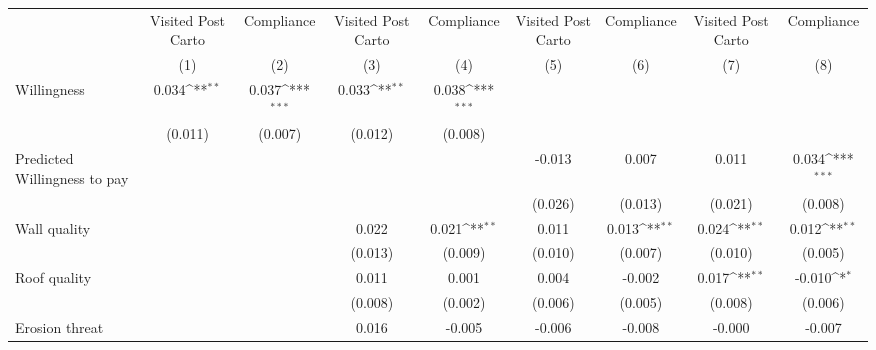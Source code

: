 {
\def\sym#1{\ifmmode^{#1}\else\(^{#1}\)\fi}
\begin{tabular}{l*{8}{c}}
\toprule
                &\multicolumn{1}{c}{Visited Post Carto}&\multicolumn{1}{c}{Compliance}&\multicolumn{1}{c}{Visited Post Carto}&\multicolumn{1}{c}{Compliance}&\multicolumn{1}{c}{Visited Post Carto}&\multicolumn{1}{c}{Compliance}&\multicolumn{1}{c}{Visited Post Carto}&\multicolumn{1}{c}{Compliance}\\
                &\multicolumn{1}{c}{(1)}         &\multicolumn{1}{c}{(2)}         &\multicolumn{1}{c}{(3)}         &\multicolumn{1}{c}{(4)}         &\multicolumn{1}{c}{(5)}         &\multicolumn{1}{c}{(6)}         &\multicolumn{1}{c}{(7)}         &\multicolumn{1}{c}{(8)}         \\
\midrule
Willingness     &    0.034\sym{**} &    0.037\sym{***}&    0.033\sym{**} &    0.038\sym{***}&                  &                  &                  &                  \\
                &  (0.011)         &  (0.007)         &  (0.012)         &  (0.008)         &                  &                  &                  &                  \\
Predicted Willingness to pay&                  &                  &                  &                  &   -0.013         &    0.007         &    0.011         &    0.034\sym{***}\\
                &                  &                  &                  &                  &  (0.026)         &  (0.013)         &  (0.021)         &  (0.008)         \\
Wall quality    &                  &                  &    0.022         &    0.021\sym{**} &    0.011         &    0.013\sym{**} &    0.024\sym{**} &    0.012\sym{**} \\
                &                  &                  &  (0.013)         &  (0.009)         &  (0.010)         &  (0.007)         &  (0.010)         &  (0.005)         \\
Roof quality    &                  &                  &    0.011         &    0.001         &    0.004         &   -0.002         &    0.017\sym{**} &   -0.010\sym{*}  \\
                &                  &                  &  (0.008)         &  (0.002)         &  (0.006)         &  (0.005)         &  (0.008)         &  (0.006)         \\
Erosion threat  &                  &                  &    0.016         &   -0.005         &   -0.006         &   -0.008         &   -0.000         &   -0.007         \\

\end{tabular}}

